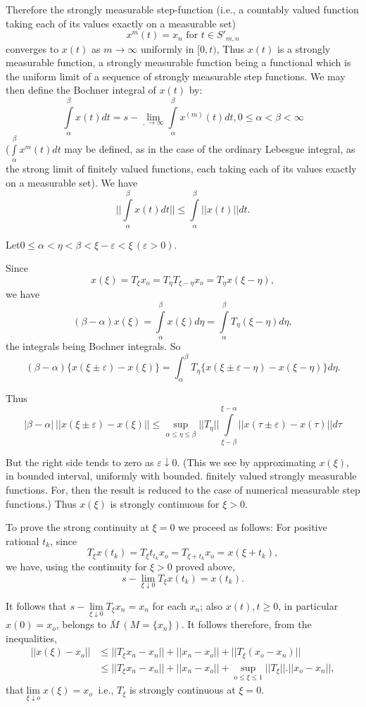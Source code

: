  Therefore the strongly measurable step-function (i.e., a countably
 valued function taking each of its values exactly on a measurable
 set) 
 $$
 x^m (t) =x_n \text{ for } t \in S'_{m,n}
 $$
converges to $x(t)$ as $m \to \infty$ uniformly in $[0,t)$, Thus
 $x(t)$ is a strongly measurable function, a strongly measurable
 function being a functional which is the uniform limit of a sequence
 of strongly measurable step functions. We may then define the
 Bochner integral of $x(t)$ by: 
 $$
 \int\limits^{\beta}_{\alpha } x(t) dt= s-\lim_{, \to \infty}
 \int\limits^{\beta}_{\alpha } x^{(m)} (t) dt, 0 \le \alpha <\beta <\infty 
 $$
 ($\int\limits^{\beta}_{\alpha } x^m(t) dt$ may be defined, as in the case of
 the ordinary Lebesgue integral, as the strong limit of finitely
 valued functions, each taking each of its values exactly on a
 measurable set). We have 
 $$
 || \int\limits_{\alpha}^{\beta} x(t) dt || \le
 \int\limits_{\alpha}^{\beta} || x(t) || dt. 
 $$

Let\pageoriginale $0 \le \alpha < \eta < \beta < \xi - \varepsilon < \xi\,
(\varepsilon > 0)$.  

Since
$$
x(\xi) = T_\xi x_o = T_\eta T_{\xi - \eta} x_o = T_\eta x(\xi - \eta),
$$
we have
$$
(\beta - \alpha) x (\xi) = \int\limits_{\alpha}^{\beta} x (\xi) d \eta
= \int\limits_\alpha^\beta T_\eta (\xi - \eta ) d \eta, 
$$
the integrals being Bochner integrals. So
$$
(\beta - \alpha) \{x( \xi \pm \varepsilon ) - x (\xi ) \} =
\int^\beta_\alpha T_\eta \{ x (\xi \pm \varepsilon - \eta) - x(\xi -
\eta) \} d \eta. 
$$

Thus
$$
| \beta - \alpha |~ || x (\xi \pm \varepsilon) - x (\xi) || \le \sup_{
 \alpha \le \eta \le \beta} || T_\eta|| \int\limits_{\xi -
 \beta}^{\xi - \alpha} || x (\tau \pm \varepsilon ) - x (\tau) || d
\tau 
$$

But the right side tends to zero as $\varepsilon \downarrow 0$. (This
we see by approximating $x(\xi)$, in bounded interval, uniformly with
bounded. finitely valued strongly measurable functions. For, then the
result is reduced to the case of numerical measurable step
functions.) Thus $x (\xi)$ is strongly continuous for $\xi > 0$. 

To prove the strong continuity at $\xi = 0$ we proceed as follows: For
positive rational $t_k$, since 
$$
T_\xi x(t_k) = T_\xi t_{t_k} x_o = T_{\xi + t_k} x_o = x(\xi + t_k),
$$
we have, using the continuity for $\xi > 0$ proved above,
$$
s-\lim_{\xi \downarrow 0} T_\xi x(t_k) = x(t_k).
$$

It follows that $s-\lim\limits_{\xi \downarrow 0} T_\xi x_n = x_n$ for
each $x_n$; also $x(t), t \ge 0$, in particular $x(0) = x_o$, belongs
to $\bar{M} ~ (M = \{x_n\})$. It follows therefore, from the
inequalities, 
\begin{align*}
 || x (\xi ) - x_o || & \le || T_\xi x_n - x_n || + || x_n - x_o || +
 || T_\xi (x_o - x_n) ||\\ 
 & \le || T_\xi x_n - x_n || + || x_n - x_o || + \sup_{o \le \xi \le
 1} || T_\xi ||. || x_o - x_n ||, 
\end{align*}
that\pageoriginale $\lim\limits_{\xi \downarrow o} x (\xi) = x_o ~ $ i.e., $T_\xi$
is strongly continuous at $\xi = 0$. 

